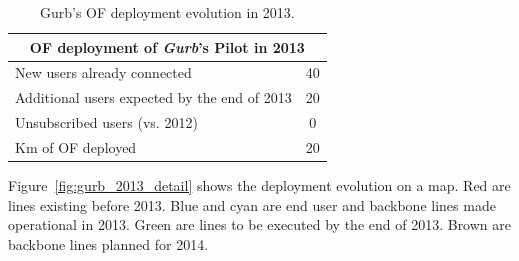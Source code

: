 \begin{table}[H]\small
  \begin{center}
    \begin{tabular}{|l|c|}
      \hline
      \multicolumn{2}{|c|}{\textbf{OF deployment of \emph{Gurb}'s Pilot in 2013}} \\
      \hline
      \hline
      New users already connected & 40 \\
      \hline
      Additional users expected by the end of 2013 & 20 \\
      \hline
      Unsubscribed users (vs. 2012) & 0 \\
      \hline
      Km of OF deployed & 20 \\
      \hline
    \end{tabular}
    \caption[Gurb pilot: pilot evolution 2013]{Gurb's OF deployment evolution in 2013.}
    \label{tab:gurb}
  \end{center}
\end{table}

Figure~\ref{fig:gurb_2013_detail} shows the deployment evolution on a map. Red are lines existing before 2013. Blue and cyan are end user and backbone lines made operational in 2013. Green are lines to be executed by the end of 2013. Brown are backbone lines planned for 2014.

